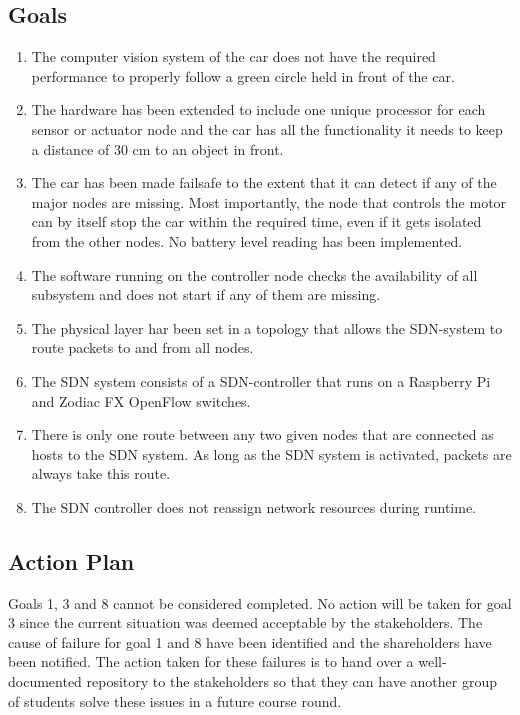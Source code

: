\documentclass[11pt, titlepage]{article} %
\begin{document}
\subsection{Goals}
\begin{enumerate}
\item The computer vision system of the car does not have the required performance to
properly follow a green circle held in front of the car.

\item The hardware has been extended to include one unique processor for each sensor or actuator
node and the car has all the functionality it needs to keep a distance of 30 cm to an
object in front.

\item The car has been made failsafe to the extent that it can detect if any of the major
nodes are missing. Most importantly, the node that controls the motor can by itself
stop the car within the required time, even if it gets isolated from the other nodes.
No battery level reading has been implemented.

\item The software running on the controller node checks the availability of all subsystem
and does not start if any of them are missing.

\item The physical layer har been set in a topology that allows the SDN-system
to route packets to and from all nodes.

\item The SDN system consists of a SDN-controller that runs on a Raspberry Pi and Zodiac FX OpenFlow
switches.

\item There is only one route between any two given nodes that are connected as hosts to the
SDN system. As long as the SDN system is activated, packets are always take this route.

\item The SDN controller does not reassign network resources during runtime.
\end{enumerate}

\subsection{Action Plan}
Goals 1, 3 and 8 cannot be considered completed. No action will be taken for goal 3 since
the current situation was deemed acceptable by the stakeholders. The cause of failure for
goal 1 and 8 have been identified and the shareholders have been notified. The action taken
for these failures is to hand over a well-documented repository to the stakeholders so that
they can have another group of students solve these issues in a future course round.
\end{document}
